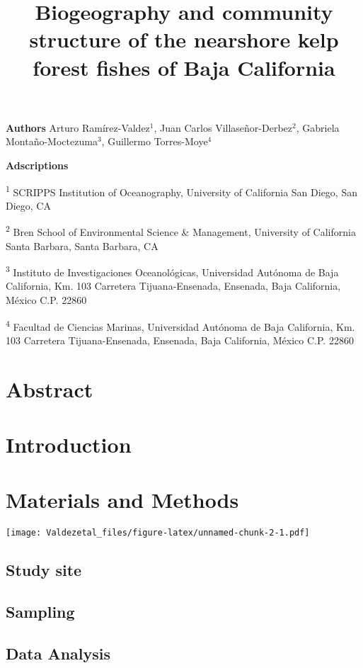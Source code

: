 \documentclass[12pt,]{article}
\title{\Large{Biogeography and community structure of the nearshore kelp forest fishes of Baja California}}
\author{}
\date{}
\begin{document}
\maketitle

\textbf{Authors} Arturo Ramírez-Valdez\(^1\), Juan Carlos
Villaseñor-Derbez\(^2\), Gabriela Montaño-Moctezuma\(^3\), Guillermo
Torres-Moye\(^4\)

\textbf{Adscriptions}

\textsuperscript{1} SCRIPPS Institution of Oceanography, University of
California San Diego, San Diego, CA

\textsuperscript{2} Bren School of Environmental Science \& Management,
University of California Santa Barbara, Santa Barbara, CA

\textsuperscript{3} Instituto de Investigaciones Oceanológicas,
Universidad Autónoma de Baja California, Km. 103 Carretera
Tijuana-Ensenada, Ensenada, Baja California, México C.P. 22860

\textsuperscript{4} Facultad de Ciencias Marinas, Universidad Autónoma
de Baja California, Km. 103 Carretera Tijuana-Ensenada, Ensenada, Baja
California, México C.P. 22860

\section{Abstract}\label{abstract}

\section{Introduction}\label{introduction}

\section{Materials and Methods}\label{materials-and-methods}

\texttt{[image: Valdezetal\_files/figure-latex/unnamed-chunk-2-1.pdf]}

\subsection{Study site}\label{study-site}

\subsection{Sampling}\label{sampling}

\subsection{Data Analysis}\label{data-analysis}
\end{document}
